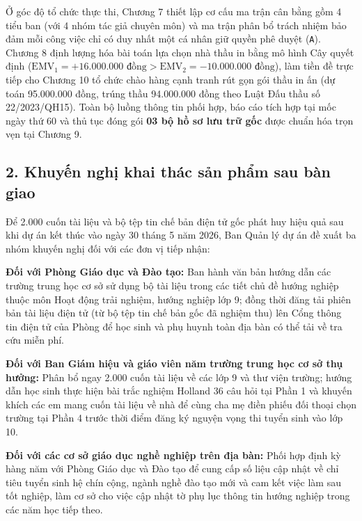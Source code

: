 Ở góc độ tổ chức thực thi, Chương 7 thiết lập cơ cấu ma trận cân bằng gồm 4 tiểu ban (với 4 nhóm tác giả chuyên môn) và ma trận phân bổ trách nhiệm bảo đảm mỗi công việc chỉ có duy nhất một cá nhân giữ quyền phê duyệt (\texttt{A}). Chương 8 định lượng hóa bài toán lựa chọn nhà thầu in bằng mô hình Cây quyết định ($\text{EMV}_1 = +16.000.000\text{ đồng} > \text{EMV}_2 = -10.000.000\text{ đồng}$), làm tiền đề trực tiếp cho Chương 10 tổ chức chào hàng cạnh tranh rút gọn gói thầu in ấn (dự toán 95.000.000 đồng, trúng thầu 94.000.000 đồng theo Luật Đấu thầu số 22/2023/QH15). Toàn bộ luồng thông tin phối hợp, báo cáo tích hợp tại mốc ngày thứ 60 và thủ tục đóng gói \textbf{03 bộ hồ sơ lưu trữ gốc} được chuẩn hóa trọn vẹn tại Chương 9.

\subsection{2. Khuyến nghị khai thác sản phẩm sau bàn giao}

Để 2.000 cuốn tài liệu và bộ tệp tin chế bản điện tử gốc phát huy hiệu quả sau khi dự án kết thúc vào ngày 30 tháng 5 năm 2026, Ban Quản lý dự án đề xuất ba nhóm khuyến nghị đối với các đơn vị tiếp nhận:

\textbf{Đối với Phòng Giáo dục và Đào tạo:} Ban hành văn bản hướng dẫn các trường trung học cơ sở sử dụng bộ tài liệu trong các tiết chủ đề hướng nghiệp thuộc môn Hoạt động trải nghiệm, hướng nghiệp lớp 9; đồng thời đăng tải phiên bản tài liệu điện tử (từ bộ tệp tin chế bản gốc đã nghiệm thu) lên Cổng thông tin điện tử của Phòng để học sinh và phụ huynh toàn địa bàn có thể tải về tra cứu miễn phí.

\textbf{Đối với Ban Giám hiệu và giáo viên năm trường trung học cơ sở thụ hưởng:} Phân bổ ngay 2.000 cuốn tài liệu về các lớp 9 và thư viện trường; hướng dẫn học sinh thực hiện bài trắc nghiệm Holland 36 câu hỏi tại Phần 1 và khuyến khích các em mang cuốn tài liệu về nhà để cùng cha mẹ điền phiếu đối thoại chọn trường tại Phần 4 trước thời điểm đăng ký nguyện vọng thi tuyển sinh vào lớp 10.

\textbf{Đối với các cơ sở giáo dục nghề nghiệp trên địa bàn:} Phối hợp định kỳ hàng năm với Phòng Giáo dục và Đào tạo để cung cấp số liệu cập nhật về chỉ tiêu tuyển sinh hệ chín cộng, ngành nghề đào tạo mới và cam kết việc làm sau tốt nghiệp, làm cơ sở cho việc cập nhật tờ phụ lục thông tin hướng nghiệp trong các năm học tiếp theo.

